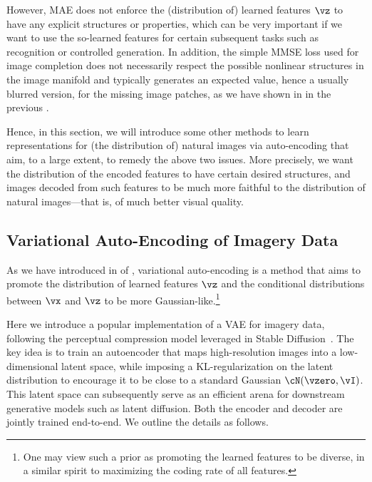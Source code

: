 \documentclass[../../book-main.tex]{subfiles}
\begin{document}
However, MAE does not enforce the (distribution of) learned features \(\vz\) to have any explicit structures or properties, which can be very important if we want to use the so-learned features for certain subsequent tasks such as recognition or controlled generation.
In addition, the simple MMSE loss used for image completion does not necessarily respect the possible nonlinear structures in the image manifold and typically generates an expected value, hence a usually blurred version, for the missing image patches, as we have shown in  in the previous .

Hence, in this section, we will introduce some other methods to learn representations for (the distribution of) natural images via auto-encoding that aim, to a large extent, to remedy the above two issues.
More precisely, we want the distribution of the encoded features to have certain desired structures, and images decoded from such features to be much more faithful to the distribution of natural images---that is, of much better visual quality.

\subsection{Variational Auto-Encoding of Imagery Data}
\label{sec:VAE-implement}

As we have introduced in  of , variational auto-encoding is a method that aims to promote the distribution of learned features \(\vz\) and the conditional distributions between \(\vx\) and \(\vz\) to be more Gaussian-like.\footnote{One may view such a prior as promoting the learned features to be diverse, in a similar spirit to maximizing the coding rate of all features.}

Here we introduce a popular implementation of a VAE for imagery data, following the perceptual compression model leveraged in Stable Diffusion~\citep{rombach2022high}.
The key idea is to train an autoencoder that maps high-resolution images into a low-dimensional latent space, while imposing a KL-regularization on the latent distribution to encourage it to be close to a standard Gaussian \(\cN(\vzero, \vI)\).
This latent space can subsequently serve as an efficient arena for downstream generative models such as latent diffusion.
Both the encoder and decoder are jointly trained end-to-end. We outline the details as follows.
\end{document}
